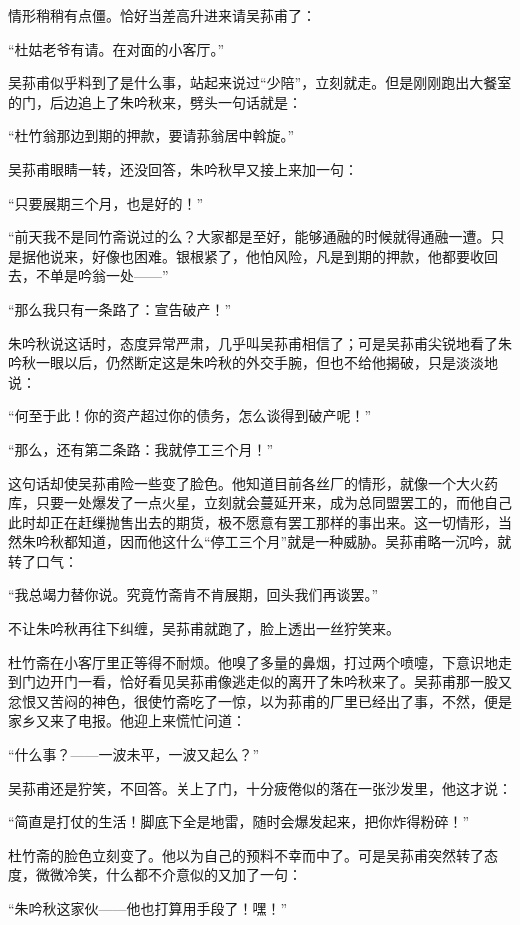 \par 情形稍稍有点僵。恰好当差高升进来请吴荪甫了：
\par “杜姑老爷有请。在对面的小客厅。”
\par 吴荪甫似乎料到了是什么事，站起来说过“少陪”，立刻就走。但是刚刚跑出大餐室的门，后边追上了朱吟秋来，劈头一句话就是：
\par “杜竹翁那边到期的押款，要请荪翁居中斡旋。”
\par 吴荪甫眼睛一转，还没回答，朱吟秋早又接上来加一句：
\par “只要展期三个月，也是好的！”
\par “前天我不是同竹斋说过的么？大家都是至好，能够通融的时候就得通融一遭。只是据他说来，好像也困难。银根紧了，他怕风险，凡是到期的押款，他都要收回去，不单是吟翁一处——”
\par “那么我只有一条路了：宣告破产！”
\par 朱吟秋说这话时，态度异常严肃，几乎叫吴荪甫相信了；可是吴荪甫尖锐地看了朱吟秋一眼以后，仍然断定这是朱吟秋的外交手腕，但也不给他揭破，只是淡淡地说：
\par “何至于此！你的资产超过你的债务，怎么谈得到破产呢！”
\par “那么，还有第二条路：我就停工三个月！”
\par 这句话却使吴荪甫险一些变了脸色。他知道目前各丝厂的情形，就像一个大火药库，只要一处爆发了一点火星，立刻就会蔓延开来，成为总同盟罢工的，而他自己此时却正在赶缫抛售出去的期货，极不愿意有罢工那样的事出来。这一切情形，当然朱吟秋都知道，因而他这什么“停工三个月”就是一种威胁。吴荪甫略一沉吟，就转了口气：
\par “我总竭力替你说。究竟竹斋肯不肯展期，回头我们再谈罢。”
\par 不让朱吟秋再往下纠缠，吴荪甫就跑了，脸上透出一丝狞笑来。
\par 杜竹斋在小客厅里正等得不耐烦。他嗅了多量的鼻烟，打过两个喷嚏，下意识地走到门边开门一看，恰好看见吴荪甫像逃走似的离开了朱吟秋来了。吴荪甫那一股又忿恨又苦闷的神色，很使竹斋吃了一惊，以为荪甫的厂里已经出了事，不然，便是家乡又来了电报。他迎上来慌忙问道：
\par “什么事？——一波未平，一波又起么？”
\par 吴荪甫还是狞笑，不回答。关上了门，十分疲倦似的落在一张沙发里，他这才说：
\par “简直是打仗的生活！脚底下全是地雷，随时会爆发起来，把你炸得粉碎！”
\par 杜竹斋的脸色立刻变了。他以为自己的预料不幸而中了。可是吴荪甫突然转了态度，微微冷笑，什么都不介意似的又加了一句：
\par “朱吟秋这家伙——他也打算用手段了！嘿！”
